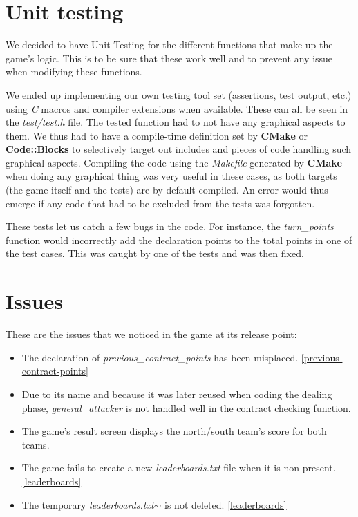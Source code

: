 \documentclass[12pt]{article}
\begin{document}
\section{Unit testing}

We decided to have Unit Testing for the different functions that make up the game's logic.
This is to be sure that these work well and to prevent any issue when modifying these functions.

We ended up implementing our own testing tool set (assertions, test output, etc.) using \textit{C} macros and compiler extensions when available.
These can all be seen in the \textit{test/test.h} file.
The tested function had to not have any graphical aspects to them. We thus had to have a compile-time definition set by \textbf{CMake} or \textbf{Code::Blocks} to selectively target out includes and pieces of code handling such graphical aspects.
Compiling the code using the \textit{Makefile} generated by \textbf{CMake} when doing any graphical thing was very useful in these cases, as both targets (the game itself and the tests) are by default compiled.
An error would thus emerge if any code that had to be excluded from the tests was forgotten.

These tests let us catch a few bugs in the code.
For instance, the \textit{turn\_points} function would incorrectly add the declaration points to the total points in one of the test cases. This was caught by one of the tests and was then fixed.

\section{Issues}
\label{issues}

These are the issues that we noticed in the game at its release point:

\begin{itemize}
\item The declaration of \textit{previous\_contract\_points} has been misplaced. \ref{previous-contract-points}
\item Due to its name and because it was later reused when coding the dealing phase, \textit{general\_attacker} is not handled well in the contract checking function.
\item The game's result screen displays the north/south team's score for both teams.
\item The game fails to create a new \textit{leaderboards.txt} file when it is non-present. \ref{leaderboards}
\item The temporary \textit{leaderboards.txt$\sim$} is not deleted. \ref{leaderboards}
\end{itemize}
\end{document}

